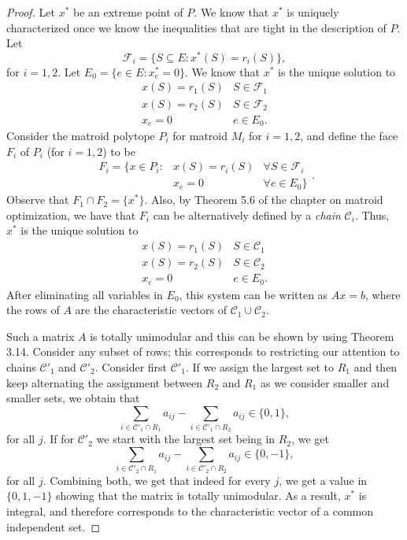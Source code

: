 \documentclass[12pt]{article}
\begin{document}
\begin{proof}
Let $x^*$ be an extreme point of $P$. We know that $x^*$ is uniquely
characterized once we know the inequalities that are tight in the
description of $P$. Let $$\mathcal{F}_i=\{S\subseteq E:
x^*(S)=r_i(S)\},$$ for $i=1,2$. Let $E_0=\{e\in E: x^*_e=0\}$. We know
that $x^*$ is the unique solution to 
$$\begin{array}{ll}
x(S)=r_1(S) & S\in \mathcal{F}_1 \\
x(S)=r_2(S) & S \in \mathcal{F}_2 \\
x_e = 0 & e\in E_0.
\end{array}$$
Consider the matroid polytope $P_i$ for matroid $M_i$ for $i=1,2$, and
define the face $F_i$ of $P_i$ (for $i=1,2$) to be 
$$\begin{array}{rll} 
F_i = \{x\in P_i: & x(S) = r_i(S) & \forall S\in \mathcal{F}_i\\
& x_e =0 & \forall e\in E_0\}
\end{array}.$$
Observe that $F_1\cap F_2=\{x^*\}$. Also, by Theorem 5.6 of the
chapter on matroid optimization, we have that $F_i$ can be
alternatively defined by a {\it chain} $\mathcal{C}_i$. Thus, $x^*$ is
the unique solution to
$$\begin{array}{ll}
x(S) = r_1(S) & S\in \mathcal{C}_1 \\
x(S) = r_2(S) & S\in \mathcal{C}_2 \\
x_e=0 & e\in E_0.
\end{array}$$
After eliminating all variables in $E_0$, this system can be written
as $Ax=b$, where the rows of $A$ are the characteristic vectors of
$\mathcal{C}_1 \cup \mathcal{C}_2$. 

Such a matrix $A$ is totally unimodular and this can be shown by using
Theorem 3.14. Consider any subset of rows; this corresponds to
restricting our attention to chains $\mathcal{C}'_1$ and
$\mathcal{C}'_2$. Consider first $\mathcal{C}'_1$. If we assign the largest set to $R_1$ and then keep
alternating the assignment between $R_2$ and $R_1$ as we consider
smaller and smaller sets, we obtain that 
$$\sum_{i\in \mathcal{C}'_1\cap R_1} a_{ij} - \sum_{i\in
\mathcal{C}'_1\cap R_2} a_{ij}\in \{0,1\},$$ for all $j$. If for
$\mathcal{C}'_2$ we start with the largest set being in  $R_2$, we get
$$\sum_{i\in \mathcal{C}'_2\cap R_1} a_{ij} - \sum_{i\in
\mathcal{C}'_2\cap R_2} a_{ij}\in \{0,-1\},$$ for all $j$. Combining
both, we get that indeed for every $j$, we get a value in $\{0,1,-1\}$
showing that the matrix is totally unimodular. As a result, $x^*$ is
integral, and therefore corresponds to the characteristic vector of a
common independent set. 
\end{proof}
\end{document}
